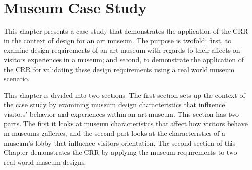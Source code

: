 \documentclass[12pt]{ucthesis}
\begin{document}


\chapter{Museum Case Study} \label{case study}
This chapter presents a case study that demonstrates the application of the CRR in the context of design for an art museum. The purpose is twofold: first, to examine design requirements of an art museum with regards to their affects on visitors experiences in a museum; and second, to demonstrate the application of the CRR for validating these design requirements using a real world museum scenario. 


This chapter is divided into two sections. The first section sets up the context of the case study by examining museum design characteristics that influence visitors' behavior and experiences within an art museum. This section has two parts. The first it looks at museum characteristics that affect how visitors behave in museums galleries, and the second part looks at the characteristics of a museum's lobby that influence visitors orientation. The second section of this Chapter demonstrates the CRR by applying the museum requirements to two real world museum designs.  

\end{document}
